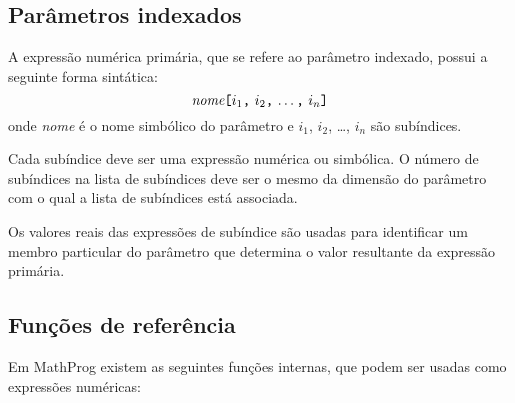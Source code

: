 \documentclass[11pt, brazil]{report}
\begin{document}

\subsection{Parâmetros indexados}

A expressão numérica primária, que se refere ao parâmetro indexado,
possui a seguinte forma sintática:
$$
\mbox{{\it nome}{\tt[}$i_1${\tt,} $i_2${\tt,} \dots{\tt,} $i_n${\tt]}}
$$
onde {\it nome} é o nome simbólico do parâmetro e $i_1$, $i_2$,
\dots, $i_n$ são subíndices.

Cada subíndice deve ser uma expressão numérica ou simbólica. O número
de subíndices na lista de subíndices deve ser o mesmo da dimensão
do parâmetro com o qual a lista de subíndices está associada.

Os valores reais das expressões de subíndice são usadas para identificar
um membro particular do parâmetro que determina o valor resultante
da expressão primária.

%
%

\newpage

\subsection{Funções de referência}

Em MathProg existem as seguintes funções internas, que podem ser
usadas como expressões numéricas:

\end{document}
